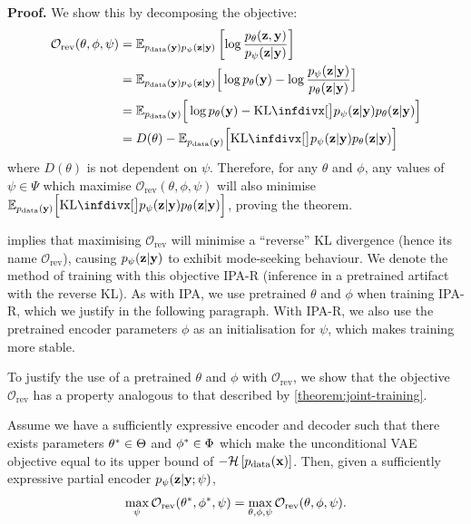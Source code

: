 \textbf{Proof.}
We show this by decomposing the objective:
\begin{align} \label{eq:reverse-obj-supp}
  \mathcal{O}_\text{rev}(\theta, \phi, \psi ) &= \EX_{\pdata (\rvy)p_\psi(\rvz|\rvy)} \left[ \log\frac{p_\theta(\rvz,\rvy)}{p_\psi(\rvz|\rvy)} \right] \\
                                                   &= \EX_{\pdata (\rvy)p_\psi(\rvz|\rvy)}\Big[ \log p_\theta(\rvy) - \log\frac{p_\psi(\rvz|\rvy)}{p_\theta(\rvz|\rvy)} \Big] \\
  &= \EX_{\pdata (\rvy)}\Big[ \log p_\theta(\rvy) - \kl[\big] { p_\psi(\rvz|\rvy) }{ p_\theta(\rvz|\rvy) } \Big] \\
                                                   &= D(\theta) - \EX_{\pdata (\rvy)}\Big[ \kl[\big] { p_\psi(\rvz|\rvy) }{ p_\theta(\rvz|\rvy) } \Big]
\end{align}
where $D(\theta)$ is not dependent on $\psi$. Therefore, for any $\theta$
and $\phi$, any values of $\psi\in\Psi$ which maximise
$\mathcal{O}_\text{rev}(\theta, \phi, \psi )$ will also minimise
$\EX_{\pdata (\rvy)}\Big[ \kl[\big] { p_\psi(\rvz|\rvy) }{
  p_\theta(\rvz|\rvy) } \Big]$, proving the theorem.


 implies that maximising $\mathcal{O}_{\text{rev}}$
will minimise a ``reverse'' KL divergence (hence its name $\mathcal{O}_{\text{rev}}$), causing $p_\psi({\mathbf{z}}|{\mathbf{y}})$ to
exhibit mode-seeking behaviour. We denote the method of training with this
objective IPA-R (inference in a pretrained artifact with the reverse KL).
As with IPA, we use pretrained $\theta$ and $\phi$ when training IPA-R, which we
justify in the following paragraph. With IPA-R, we also use the pretrained
encoder parameters $\phi$ as an initialisation for $\psi $, which makes
training more stable.

To justify the use of a pretrained $\theta$ and $\phi$ with
$\mathcal{O}_\text{rev}$, we show that the objective $\mathcal{O}_\text{rev}$
has a property analogous to that described by \cref{theorem:joint-training}.
\begin{theorem}
  \label{theorem:joint-training-rev}
  Assume we have a sufficiently expressive encoder and decoder such that there
  exists parameters ${\theta}^*\in\Theta$ and ${\phi}^*\in\Phi$
  which make the unconditional VAE objective equal to its
  upper bound of $-\mathcal{H}\left[ p_{\rm{data}}({\mathbf{x}}) \right]$. Then, given a
  sufficiently expressive partial encoder $p_\psi({\mathbf{z}}|{\mathbf{y}}; \psi)$,
  \begin{equation*}
    \max_{\psi } \mathcal{O}_\text{rev}({\theta}^*, {\phi}^*, \psi ) = \max_{\theta, \phi, \psi } \mathcal{O}_\text{rev}(\theta, \phi, \psi ).
  \end{equation*}
\end{theorem}

